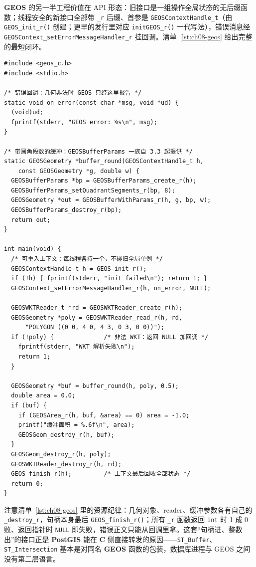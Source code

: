 \documentclass[12pt,a4paper,fontset=fandol]{ctexbook}
\newcommand{\Fn}[1]{\texttt{#1()}}
\newcommand{\Tp}[1]{\texttt{#1}}
\newcommand{\Bk}{\allowbreak}
\newcommand{\Lib}[1]{\textbf{#1}}
\newcommand{\Lang}[1]{\textsf{\bfseries #1}}
\newcommand{\CL}{\Lang{C}}
\begin{document}
\Lib{GEOS} 的另一半工程价值在 API 形态：旧接口是一组操作全局状态的无后缀函数；线程安全的新接口全部带 \Tp{\_r} 后缀、首参是 \Tp{GEOSContext{\Bk}Handle\_{\Bk}t}（由 \Fn{GEOS\_{\Bk}init\_{\Bk}r} 创建；更早的发行里对应 \Fn{initGEOS\_r} 一代写法），错误消息经 \Tp{GEOSContext\allowbreak\_{\Bk}set{\Bk}Error{\Bk}Message{\Bk}Handler\_{\Bk}r} 挂回调。清单~\ref{lst:ch08-geos} 给出完整的最短闭环。

\begin{lstlisting}[style=cstyle,caption={\Lib{GEOS}：可重入上下文、WKT 读入、缓冲区与面积},label={lst:ch08-geos}]
#include <geos_c.h>
#include <stdio.h>

/* 错误回调：几何非法时 GEOS 只经这里报告 */
static void on_error(const char *msg, void *ud) {
  (void)ud;
  fprintf(stderr, "GEOS error: %s\n", msg);
}

/* 带圆角段数的缓冲：GEOSBufferParams 一族自 3.3 起提供 */
static GEOSGeometry *buffer_round(GEOSContextHandle_t h,
    const GEOSGeometry *g, double w) {
  GEOSBufferParams *bp = GEOSBufferParams_create_r(h);
  GEOSBufferParams_setQuadrantSegments_r(bp, 8);
  GEOSGeometry *out = GEOSBufferWithParams_r(h, g, bp, w);
  GEOSBufferParams_destroy_r(bp);
  return out;
}

int main(void) {
  /* 可重入上下文：每线程各持一个，不碰旧全局单例 */
  GEOSContextHandle_t h = GEOS_init_r();
  if (!h) { fprintf(stderr, "init failed\n"); return 1; }
  GEOSContext_setErrorMessageHandler_r(h, on_error, NULL);

  GEOSWKTReader_t *rd = GEOSWKTReader_create_r(h);
  GEOSGeometry *poly = GEOSWKTReader_read_r(h, rd,
      "POLYGON ((0 0, 4 0, 4 3, 0 3, 0 0))");
  if (!poly) {              /* 非法 WKT：返回 NULL 加回调 */
    fprintf(stderr, "WKT 解析失败\n");
    return 1;
  }

  GEOSGeometry *buf = buffer_round(h, poly, 0.5);
  double area = 0.0;
  if (buf) {
    if (GEOSArea_r(h, buf, &area) == 0) area = -1.0;
    printf("缓冲面积 = %.6f\n", area);
    GEOSGeom_destroy_r(h, buf);
  }
  GEOSGeom_destroy_r(h, poly);
  GEOSWKTReader_destroy_r(h, rd);
  GEOS_finish_r(h);         /* 上下文最后回收全部状态 */
  return 0;
}
\end{lstlisting}

注意清单~\ref{lst:ch08-geos} 里的资源纪律：几何对象、reader、缓冲参数各有自己的 \Tp{\_destroy\_r}，句柄本身最后 \Fn{GEOS\_finish\_r}；所有 \Tp{\_r} 函数返回 \Tp{int} 时 1 成 0 败、返回指针时 \Tp{NULL} 即失败，错误正文只能从回调里拿。这套``句柄进、整数出''的接口正是 \Lib{PostGIS} 能在 \CL{} 侧直接转发的原因——\Tp{ST\_Buffer}、\Tp{ST\_Intersection} 基本是对同名 \Lib{GEOS} 函数的包装，数据库进程与 GEOS 之间没有第二层语言。
\end{document}
